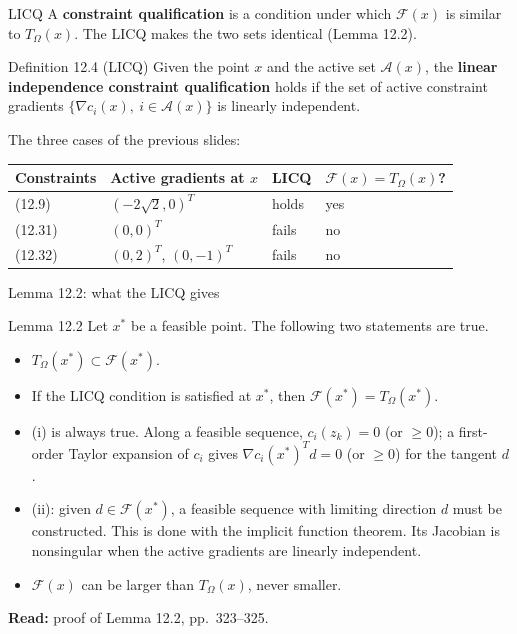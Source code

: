 \documentclass[aspectratio=169,12pt]{beamer}
\newcommand{\xs}{x^{*}}
\newcommand{\readbook}[1]{{\color{red}\textbf{Read:} #1}}
\newcommand{\cA}{\mathcal{A}}
\newcommand{\cF}{\mathcal{F}}
\newcommand{\TO}{T_{\Omega}}
\begin{document}
\begin{frame}{LICQ}
  A \textbf{constraint qualification} is a condition under which $\cF(x)$ is similar to $\TO(x)$.
  The LICQ makes the two sets identical (Lemma 12.2).
  \begin{block}{Definition 12.4 (LICQ)}
    Given the point $x$ and the active set $\cA(x)$, the \textbf{linear independence constraint
    qualification} holds if the set of active constraint gradients
    $\{\nabla c_{i}(x),\ i\in\cA(x)\}$ is linearly independent.
  \end{block}
  \vspace{0.2em}
  The three cases of the previous slides:
  \begin{center}\small\setlength\tabcolsep{8pt}
  \begin{tabular}{llll}
    \toprule
    Constraints & Active gradients at $x$ & LICQ & $\cF(x)=\TO(x)$? \\
    \midrule
    (12.9) & $(-2\sqrt2,0)^{T}$ & holds & yes \\
    (12.31) & $(0,0)^{T}$ & fails & no \\
    (12.32) & $(0,2)^{T}$, $(0,-1)^{T}$ & fails & no \\
    \bottomrule
  \end{tabular}
  \end{center}
\end{frame}

\begin{frame}{Lemma 12.2: what the LICQ gives}
  \begin{block}{Lemma 12.2}
    Let $\xs$ be a feasible point. The following two statements are true.
    \begin{itemize}
      \item[(i)] $\TO(\xs)\subset\cF(\xs)$.
      \item[(ii)] If the LICQ condition is satisfied at $\xs$, then $\cF(\xs)=\TO(\xs)$.
    \end{itemize}
  \end{block}
  \begin{itemize}\setlength\itemsep{0.35em}
    \item (i) is always true. Along a feasible sequence, $c_{i}(z_{k})=0$ (or $\ge 0$); a first-order
      Taylor expansion of $c_{i}$ gives $\nabla c_{i}(\xs)^{T}d=0$ (or $\ge 0$) for the tangent $d$.
    \item (ii): given $d\in\cF(\xs)$, a feasible sequence with limiting direction $d$ must be
      constructed. This is done with the implicit function theorem. Its Jacobian is nonsingular
      when the active gradients are linearly independent.
    \item $\cF(x)$ can be larger than $\TO(x)$, never smaller.
  \end{itemize}
  \readbook{proof of Lemma 12.2, pp.~323--325.}
\end{frame}
\end{document}
